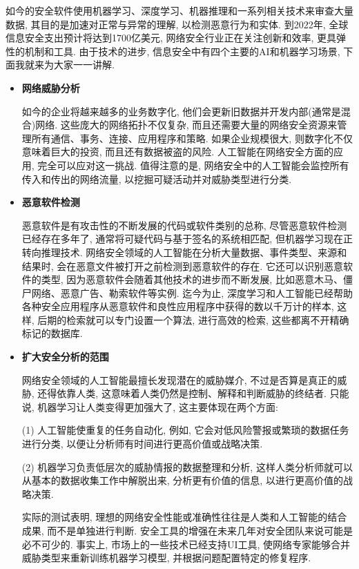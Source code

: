 如今的安全软件使用机器学习、深度学习、机器推理和一系列相关技术来审查大量数据, 其目的是加速对正常与异常的理解, 以检测恶意行为和实体.
到2022年, 全球信息安全支出预计将达到1700亿美元, 网络安全行业正在关注创新和效率, 更具弹性的机制和工具. 由于技术的进步, 信息安全中有四个主要的AI和机器学习场景, 下面我就来为大家一一讲解.
\begin{itemize}
\item \textbf{网络威胁分析}

如今的企业将越来越多的业务数字化, 他们会更新旧数据并开发内部(通常是混合)网络. 这些庞大的网络拓扑不仅复杂, 而且还需要大量的网络安全资源来管理所有通信、事务、连接、应用程序和策略.
如果企业规模很大, 则数字化不仅意味着巨大的投资, 而且还有数据被盗的风险. 人工智能在网络安全方面的应用, 完全可以应对这一挑战. 值得注意的是, 网络安全中的人工智能会监控所有传入和传出的网络流量, 以挖掘可疑活动并对威胁类型进行分类.

\item \textbf{恶意软件检测}

恶意软件是有攻击性的不断发展的代码或软件类别的总称, 尽管恶意软件检测已经存在多年了, 通常将可疑代码与基于签名的系统相匹配, 但机器学习现在正转向推理技术.
网络安全领域的人工智能在分析大量数据、事件类型、来源和结果时, 会在恶意文件被打开之前检测到恶意软件的存在. 它还可以识别恶意软件的类型, 因为恶意软件会随着其他技术的进步而不断发展, 比如恶意木马、僵尸网络、恶意广告、勒索软件等实例.
迄今为止, 深度学习和人工智能已经帮助各种安全应用程序从恶意软件和良性应用程序中获得的数以千万计的样本, 这样, 后期的检索就可以专门设置一个算法, 进行高效的检索, 这些都离不开精确标记的数据库.

\item \textbf{扩大安全分析的范围}

网络安全领域的人工智能最擅长发现潜在的威胁媒介, 不过是否算是真正的威胁, 还得依靠人类, 这意味着人类仍然是控制、解释和判断威胁的终结者. 只能说, 机器学习让人类变得更加强大了, 这主要体现在两个方面:

(1) 人工智能使重复的任务自动化, 例如, 它会对低风险警报或繁琐的数据任务进行分类, 以便让分析师有时间进行更高价值或战略决策.

(2) 机器学习负责低层次的威胁情报的数据整理和分析, 这样人类分析师就可以从基本的数据收集工作中解脱出来, 分析更有价值的信息, 以进行更高价值的战略决策.

实际的测试表明, 理想的网络安全性能或准确性往往是人类和人工智能的结合成果, 而不是单独进行判断. 安全工具的增强在未来几年对安全团队来说可能是必不可少的. 事实上, 市场上的一些技术已经支持UI工具, 使网络专家能够合并威胁类型来重新训练机器学习模型, 并根据问题配置特定的修复程序.


\end{itemize}

